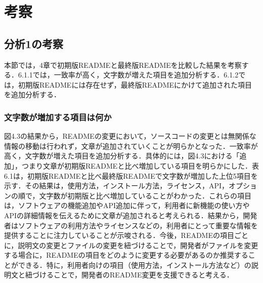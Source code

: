\documentclass[submit]{ipsj}
\begin{document}
\section{考察}
\subsection{分析1の考察}
本節では，4章で初期版READMEと最終版READMEを比較した結果を考察する．6.1.1では，一致率が高く，文字数が増えた項目を追加分析する．6.1.2では，初期版READMEには存在せず，最終版READMEにかけて追加された項目を追加分析する．

\subsubsection{文字数が増加する項目は何か}
図4.3の結果から，READMEの変更において，ソースコードの変更とは無関係な情報の移動は行われず，文章が追加されていくことが明らかとなった．一致率が高く，文字数が増えた項目を追加分析する．具体的には，図4.3における「追加」，つまり文章が初期版READMEと比べ増加している項目を明らかにした．表6.1は，初期版READMEと比べ最終版READMEで文字数が増加した上位5項目を示す．その結果は，使用方法，インストール方法，ライセンス，API，オプションの順で，文字数が初期版と比べ増加していることがわかった．これらの項目は，ソフトウェアの機能追加やAPI追加に伴って，利用者に新機能の使い方やAPIの詳細情報を伝えるために文章が追加されると考えられる．結果から，開発者はソフトウェアの利用方法やライセンスなどの，利用者にとって重要な情報を提供することに注力していることが示唆される．今後，READMEの項目ごとに，説明文の変更とファイルの変更を紐づけることで，開発者がファイルを変更する場合に，READMEの項目をどのように変更する必要があるのか推奨することができる．特に，利用者向けの項目（使用方法，インストール方法など）の説明文と紐づけることで，開発者のREADME変更を支援できると考える．




\end{document}
